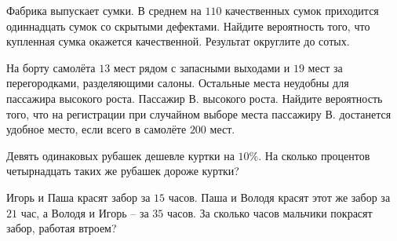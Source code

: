 \begin{listofex}
	\item Фабрика выпускает сумки. В среднем на \( 110 \) качественных сумок приходится одиннадцать сумок со скрытыми дефектами. Найдите вероятность того, что купленная сумка окажется качественной. Результат округлите до сотых.
	\item На борту самолёта \( 13 \) мест рядом с запасными выходами и \( 19 \) мест за перегородками, разделяющими салоны. Остальные места неудобны для пассажира высокого роста. Пассажир В. высокого роста. Найдите вероятность того, что на регистрации при случайном выборе места пассажиру В. достанется удобное место, если всего в самолёте \( 200 \) мест.
	\item Девять одинаковых рубашек дешевле куртки на \( 10\% \). На сколько процентов четырнадцать таких же рубашек дороже куртки?
	\item Игорь и Паша красят забор за \( 15 \) часов. Паша и Володя красят этот же забор за \( 21 \) час, а Володя и Игорь – за \( 35 \) часов. За сколько часов мальчики покрасят забор, работая втроем?
\end{listofex}
\newpage
{}
